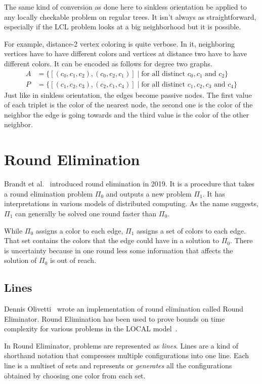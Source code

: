 \documentclass[english, 12pt, a4paper, sci, a-1b, online]{aaltothesis}
\begin{document}
The same kind of conversion as done here to sinkless orientation be applied to any locally checkable problem on regular trees. It isn't always as straightforward, especially if the LCL problem looks at a big neighborhood but it is possible.

For example, distance-2 vertex coloring is quite verbose. In it, neighboring vertices have to have different colors and vertices at distance two have to have different colors. It can be encoded as follows for degree two graphs.
\begin{align*}
A &= \{[(c_0, c_1, c_2), (c_0, c_2, c_1)] \mid \text{for all distinct } c_0, c_1\text{ and }c_2 \} \\
P &= \{[(c_1, c_2, c_3), (c_2, c_1, c_4)] \mid \text{for all distinct } c_1, c_2, c_3\text{ and }c_4 \}
\end{align*}
Just like in sinkless orientation, the edges become passive nodes. The first value of each triplet is the color of the nearest node, the second one is the color of the neighbor the edge is going towards and the third value is the color of the other neighbor.

\section{Round Elimination}

Brandt et al.~\cite{speedup} introduced round elimination in 2019. It is a procedure that takes a round elimination problem $\Pi_0$ and outputs a new problem $\Pi_1$. It has interpretations in various models of distributed computing. As the name suggests, $\Pi_1$ can generally be solved one round faster than $\Pi_0$.

While $\Pi_0$ assigns a color to each edge, $\Pi_1$ assigns a set of colors to each edge. That set contains the colors that the edge could have in a solution to $\Pi_0$. There is uncertainty because in one round less some information that affects the solution of $\Pi_0$ is out of reach.

\subsection{Lines}

Dennis Olivetti~\cite{RE} wrote an implementation of round elimination called Round Eliminator. Round Elimination has been used to prove bounds on time complexity for various problems in the LOCAL model~\cite{tc1, tc2, tc3}.

In Round Eliminator, problems are represented as \emph{lines}. Lines are a kind of shorthand notation that compresses multiple configurations into one line. Each line is a multiset of sets and represents or \emph{generates} all the configurations obtained by choosing one color from each set.~\cite{RE}
\end{document}
